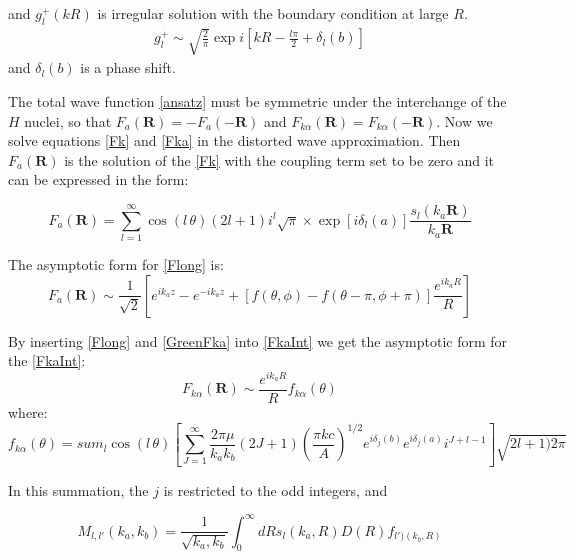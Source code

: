 and $ g^{+}_l(kR) $ is irregular solution with the boundary condition at large $ R $.
\begin{equation}
\begin{split}
g^{+}_{l} \sim \sqrt{\frac{2}{\pi}}\exp i\left[kR - \frac{l\pi}{2} + \delta_l(b)\right]
\end{split}
\end{equation}
and $  \delta_l(b) $ is a phase shift. 

The total wave function \eqref{ansatz} must be symmetric under the interchange of the $ H $ nuclei, so that $ F_a(\mathbf{R}) = -F_a(-\mathbf{R}) $ and $ F_{k\alpha}(\mathbf{R}) =  F_{k\alpha}(-\mathbf{R}) $. Now we solve equations \eqref{Fk} and \eqref{Fka} in the distorted wave approximation. Then $ F_a(\mathbf{R}) $ is the solution of the \eqref{Fk} with the coupling term set to be zero and it can be expressed in the form:


\begin{equation}\label{Flong}
F_a(\mathbf{R}) = \sum_{l=1}^{\infty}{\cos(l\,\theta)(2l+1)i^{l}\sqrt{\pi}\times \exp[i\delta_l(a)]\frac{s_l(k_a\mathbf{R})}{k_a\mathbf{R} } } 
\end{equation}

The asymptotic form for \eqref{Flong} is:
\begin{equation}\label{FlongA}
F_a(\mathbf{R}) \sim \frac{1}{\sqrt{2}}\left[e^{ik_az}-e^{-ik_az} + [f(\theta,\phi) - f(\theta-\pi,\phi+\pi)]\frac{e^{ik_aR}}{R}\right]
\end{equation}

By inserting \eqref{Flong} and \eqref{GreenFka} into \eqref{FkaInt} we get the asymptotic form for the  \eqref{FkaInt}:
\begin{equation}\label{FlongAA}
F_{k\alpha}(\mathbf{R}) \sim \frac{e^{ik_aR}}{R}f_{k\alpha}(\theta)
\end{equation}
where:
\begin{equation}\label{fkaa}
f_{k\alpha}(\theta) = sum_{l}{\cos(l\,\theta)\left[\sum_{J=1}^{\infty}{\frac{2\pi\mu}{k_ak_b}(2J+1)\left(\frac{\pi k c}{A}\right)^{1/2}e^{i\delta_j(b)}e^{i\delta_j(a)}i^{J+l-1} }\right]\sqrt{2l+1)2\pi}}
\end{equation}

In this summation, the $ j $ is restricted to the odd integers, and 

\begin{equation}\label{Mll}
M_{l,l'}(k_a,k_b) = \frac{1}{\sqrt{k_a,k_b}}\int_0^{\infty}{dRs_l(k_a,R)D(R)f_{l')(k_b,R)} }
\end{equation}

